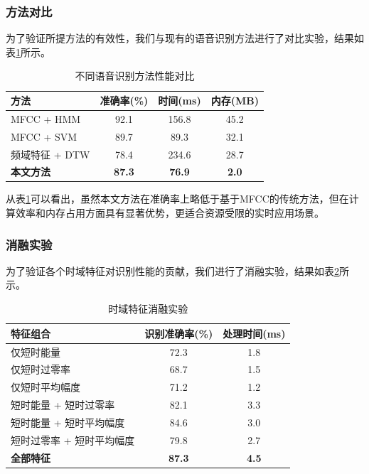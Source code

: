 \documentclass[sigconf,nonacm]{acmart}
\begin{document}
\subsubsection{方法对比}

为了验证所提方法的有效性，我们与现有的语音识别方法进行了对比实验，结果如表\ref{tab:method_comparison}所示。

\begin{table}[htbp]
\caption{不同语音识别方法性能对比}
\label{tab:method_comparison}
\begin{center}
\begin{tabular}{lccc}
\toprule
\textbf{方法} & \textbf{准确率(\%)} & \textbf{时间(ms)} & \textbf{内存(MB)} \\
\midrule
MFCC + HMM & 92.1 & 156.8 & 45.2 \\
MFCC + SVM & 89.7 & 89.3 & 32.1 \\
频域特征 + DTW & 78.4 & 234.6 & 28.7 \\
\midrule
\textbf{本文方法} & \textbf{87.3} & \textbf{76.9} & \textbf{2.0} \\
\bottomrule
\end{tabular}
\end{center}
\end{table}

从表\ref{tab:method_comparison}可以看出，虽然本文方法在准确率上略低于基于MFCC的传统方法，但在计算效率和内存占用方面具有显著优势，更适合资源受限的实时应用场景。

\subsubsection{消融实验}

为了验证各个时域特征对识别性能的贡献，我们进行了消融实验，结果如表\ref{tab:ablation_study}所示。

\begin{table}[htbp]
\caption{时域特征消融实验}
\label{tab:ablation_study}
\begin{center}
\begin{tabular}{lcc}
\toprule
\textbf{特征组合} & \textbf{识别准确率(\%)} & \textbf{处理时间(ms)} \\
\midrule
仅短时能量 & 72.3 & 1.8 \\
仅短时过零率 & 68.7 & 1.5 \\
仅短时平均幅度 & 71.2 & 1.2 \\
短时能量 + 短时过零率 & 82.1 & 3.3 \\
短时能量 + 短时平均幅度 & 84.6 & 3.0 \\
短时过零率 + 短时平均幅度 & 79.8 & 2.7 \\
\midrule
\textbf{全部特征} & \textbf{87.3} & \textbf{4.5} \\
\bottomrule
\end{tabular}
\end{center}
\end{table}
\end{document}
